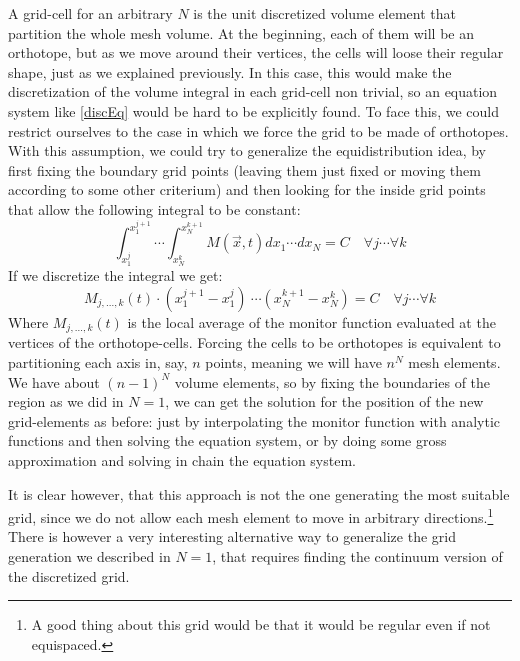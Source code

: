 \documentclass[11pt, a4paper]{article} %
\begin{document}
A grid-cell for an arbitrary $N$ is the unit discretized volume element that partition the whole mesh volume. At the beginning, each of them will be an orthotope, but as we move around their vertices, the cells will loose their regular shape, just as we explained previously. In this case, this would make the discretization of the volume integral in each grid-cell non trivial, so an equation system like \eqref{discEq} would be hard to be explicitly found. To face this, we could restrict ourselves to the case in which we force the grid to be made of orthotopes. With this assumption, we could try to generalize the equidistribution idea, by first fixing the boundary grid points (leaving them just fixed or moving them according to some other criterium) and then looking for the inside grid points that allow the following integral to be constant:
\begin{equation}
\int_{x_1^j}^{x_1^{j+1}}\cdots \int_{x_N^k}^{x_N^{k+1}} M(\vec{x},t) dx_1 \cdots dx_N=C \quad \forall j\cdots \forall k
\end{equation}
If we discretize the integral we get:
\begin{equation}\label{monitor}
 M_{j,...,k}(t)\cdot (x_1^{j+1}-x_1^j)\ \cdots (x_N^{k+1}-x_N^k) =C \quad \forall j\cdots \forall k
\end{equation}
Where $M_{j,...,k}(t)$ is the local average of the monitor function evaluated at the vertices of the orthotope-cells. Forcing the cells to be orthotopes is equivalent to partitioning each axis in, say, $n$ points, meaning we will have $n^N$ mesh elements. We have about $(n-1)^N$ volume elements, so by fixing the boundaries of the region as we did in $N=1$, we can get the solution for the position of the new grid-elements as before: just by interpolating the monitor function with analytic functions and then solving the equation system, or by doing some gross approximation and solving in chain the equation system.

It is clear however, that this approach is not the one generating the most suitable grid, since we do not allow each mesh element to move in arbitrary directions.\footnote{ A good thing about this grid would be that it would be regular even if not equispaced.} There is however a very interesting alternative way to generalize the grid generation we described in $N=1$, that requires finding the continuum version of the discretized grid.

\end{document}
